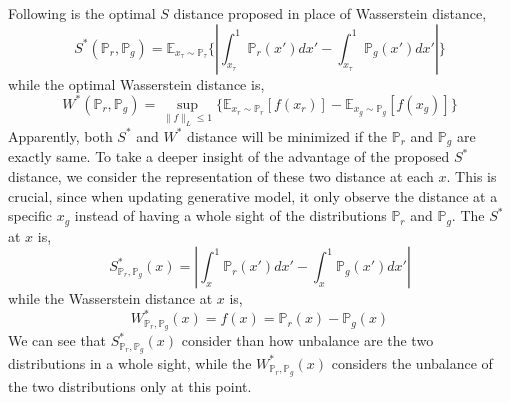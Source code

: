 \documentclass[letterpaper]{article} %
\begin{document}
Following is the optimal $S$ distance proposed in place of Wasserstein distance,
\begin{equation}\label{S-distance}
  S^{\ast}(\mathbb{P}_r,\mathbb{P}_g)=\mathbb{E}_{x_\tau \sim \mathbb{P}_\tau} \{ | \int_{x_\tau}^{1} \mathbb{P}_r(x') d x' - \int_{x_\tau}^{1} \mathbb{P}_g(x') d x' | \}
\end{equation}
while the optimal Wasserstein distance is,
\begin{equation}\label{W-distance}
  W^{\ast}(\mathbb{P}_r,\mathbb{P}_g)=\sup_{\|f\|_L \leq 1} \{ \mathbb{E}_{x_r \sim \mathbb{P}_r} [f(x_r)] - \mathbb{E}_{x_g \sim \mathbb{P}_g} [f(x_g)] \}
\end{equation}
Apparently, both $S^{\ast}$ and $W^{\ast}$ distance will be minimized if the $\mathbb{P}_r$ and $\mathbb{P}_g$ are exactly same.
To take a deeper insight of the advantage of the proposed $S^{\ast}$ distance, we consider the representation of these two distance at each $x$.
This is crucial, since when updating generative model, it only observe the distance at a specific $x_g$ instead of having a whole sight of the distributions $\mathbb{P}_r$ and $\mathbb{P}_g$.
The $S^{\ast}$ at $x$ is,
\begin{equation}\label{S-distance-x}
  S^{\ast}_{\mathbb{P}_r,\mathbb{P}_g}(x)= | \int_{x}^{1} \mathbb{P}_r(x') d x' - \int_{x}^{1} \mathbb{P}_g(x') d x' |
\end{equation}
while the Wasserstein distance at $x$ is,
\begin{equation}\label{W-distance-x}
  W^{\ast}_{\mathbb{P}_r,\mathbb{P}_g}(x)= f(x)= \mathbb{P}_r(x) - \mathbb{P}_g(x)
\end{equation}
We can see that $S^{\ast}_{\mathbb{P}_r,\mathbb{P}_g}(x)$ consider than how unbalance are the two distributions in a whole sight, while the $W^{\ast}_{\mathbb{P}_r,\mathbb{P}_g}(x)$ considers the unbalance of the two distributions only at this point.
\end{document}
